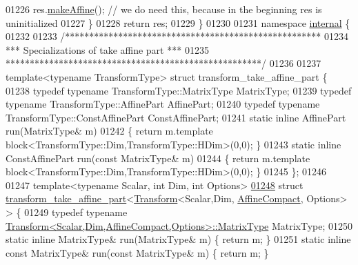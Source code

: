 \begin{DoxyCode}
01226     res.\hyperlink{group___geometry___module_a18580c6c151bac89f03818164dd19632}{makeAffine}(); \textcolor{comment}{// we do need this, because in the beginning res is uninitialized}
01227   \}
01228   \textcolor{keywordflow}{return} res;
01229 \}
01230 
01231 \textcolor{keyword}{namespace }\hyperlink{namespaceinternal}{internal} \{
01232 
01233 \textcolor{comment}{/*****************************************************}
01234 \textcolor{comment}{*** Specializations of take affine part            ***}
01235 \textcolor{comment}{*****************************************************/}
01236 
01237 \textcolor{keyword}{template}<\textcolor{keyword}{typename} TransformType> \textcolor{keyword}{struct }transform\_take\_affine\_part \{
01238   \textcolor{keyword}{typedef} \textcolor{keyword}{typename} TransformType::MatrixType MatrixType;
01239   \textcolor{keyword}{typedef} \textcolor{keyword}{typename} TransformType::AffinePart AffinePart;
01240   \textcolor{keyword}{typedef} \textcolor{keyword}{typename} TransformType::ConstAffinePart ConstAffinePart;
01241   \textcolor{keyword}{static} \textcolor{keyword}{inline} AffinePart run(MatrixType& m)
01242   \{ \textcolor{keywordflow}{return} m.template block<TransformType::Dim,TransformType::HDim>(0,0); \}
01243   \textcolor{keyword}{static} \textcolor{keyword}{inline} ConstAffinePart run(\textcolor{keyword}{const} MatrixType& m)
01244   \{ \textcolor{keywordflow}{return} m.template block<TransformType::Dim,TransformType::HDim>(0,0); \}
01245 \};
01246 
01247 \textcolor{keyword}{template}<\textcolor{keyword}{typename} Scalar, \textcolor{keywordtype}{int} Dim, \textcolor{keywordtype}{int} Options>
\hyperlink{struct_eigen_1_1internal_1_1transform__take__affine__part_3_01_transform_3_01_scalar_00_01_dim_08d14c40ff031aad52694585e78471f26}{01248} \textcolor{keyword}{struct }\hyperlink{struct_eigen_1_1internal_1_1transform__take__affine__part}{transform\_take\_affine\_part}<\hyperlink{group___geometry___module_class_eigen_1_1_transform}{Transform}<Scalar,Dim,
      \hyperlink{group__enums_ggaee59a86102f150923b0cac6d4ff05107aa30a06b60d218b709020972df47de2b0}{AffineCompact}, Options> > \{
01249   \textcolor{keyword}{typedef} \textcolor{keyword}{typename} \hyperlink{group___core___module_class_eigen_1_1_matrix}{Transform<Scalar,Dim,AffineCompact,Options>::MatrixType}
       MatrixType;
01250   \textcolor{keyword}{static} \textcolor{keyword}{inline} MatrixType& run(MatrixType& m) \{ \textcolor{keywordflow}{return} m; \}
01251   \textcolor{keyword}{static} \textcolor{keyword}{inline} \textcolor{keyword}{const} MatrixType& run(\textcolor{keyword}{const} MatrixType& m) \{ \textcolor{keywordflow}{return} m; \}

\end{DoxyCode}

